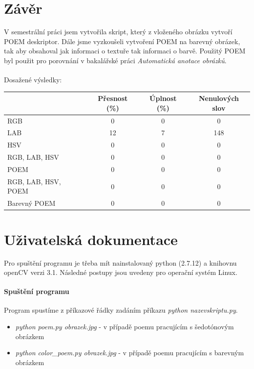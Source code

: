 \documentclass{report}
\begin{document}
\chapter{Závěr}
V semestrální práci jsem vytvořila skript, který z vloženého obrázku vytvoří POEM deskriptor. Dále jsme vyzkoušeli vytvoření POEM na barevný obrázek, tak aby obsahoval jak informaci o textuře tak informaci o barvě. Použitý POEM byl použit pro porovnání v bakalářské práci \textit{Automatická anotace obrázků}. \\
\\
Dosažené výsledky: \\

\begin{tabular}{l*{3}{c}}
	          		& Přesnost (\%) & Úplnost (\%) & Nenulových slov \\
\hline
RGB						& 0 & 0 & 0 \\
LAB	  			  		& 12 & 7 & 148  \\
HSV            			& 0 & 0 & 0  \\
RGB, LAB, HSV      		& 0 & 0 & 0  \\
POEM		     		& 0 & 0 & 0  \\
RGB, LAB, HSV, POEM		& 0 & 0 & 0  \\
Barevný POEM			& 0 & 0 & 0  \\
\end{tabular}


\chapter{Uživatelská dokumentace}
Pro spuštění programu je třeba mít nainstalovaný python (2.7.12) a knihovnu openCV verzi 3.1. Následné postupy jsou uvedeny pro operační systém Linux.

\subsubsection{Spuštění programu}
Program spustíme z příkazové řádky zadáním příkazu \textit{python nazevskriptu.py}. 
\begin{itemize}
	\item \textit{python poem.py obrazek.jpg} - v případě poemu pracujícím s šedotónovým obrázkem
	\item \textit{python color\_poem.py obrazek.jpg} - v případě poemu pracujícím s barevným obrázkem
\end{itemize}
\end{document}
